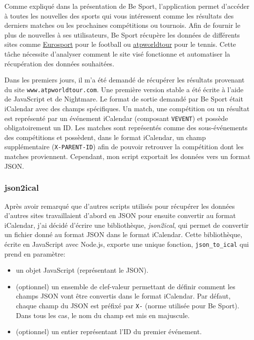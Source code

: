 Comme expliqué dans la présentation de Be Sport, l'application permet d'accéder
à toutes les nouvelles des sports qui vous intéressent comme les résultats des
derniers matches ou les prochaines compétitions ou tournois.
Afin de fournir le plus de nouvelles à ses utilisateurs, Be Sport récupère les
données de différents sites comme \href{https://eurosport.fr}{Eurosport} pour le
football ou \href{https://atpworldtour.com}{atpworldtour} pour le tennis.
Cette tâche nécessite d'analyser comment le site visé fonctionne et automatiser
la récupération des données souhaitées.

Dans les premiers jours, il m'a été demandé de récupérer les résultats provenant
du site \verb|www.atpworldtour.com|.
Une première version stable a été écrite à l'aide de JavaScript et de
Nightmare\cite{nightmare-website}. Le format de sortie demandé par Be Sport était
iCalendar avec des champs spécifiques.
Un match, une compétition ou un résultat est représenté par un événement
iCalendar (composant \verb|VEVENT|) et possède obligatoirement un ID. Les
matches sont représentés comme des sous-événements des compétitions et
possèdent, dans le format iCalendar, un champ supplémentaire
(\verb|X-PARENT-ID|) afin de pouvoir retrouver la compétition dont les matches
proviennent.
Cependant, mon script exportait les données vers un
format JSON. 

\subsubsection*{json2ical}

Après avoir remarqué que d'autres scripts utilisés pour récupérer les données
d'autres sites travaillaient d'abord en JSON pour ensuite convertir au format
iCalendar, j'ai décidé d'écrire une bibliothèque, \emph{json2ical}, qui permet
de convertir un fichier donné au format JSON dans le format iCalendar.
Cette bibliothèque, écrite en JavaScript avec Node.js, exporte une unique
fonction, \verb|json_to_ical| qui prend en paramètre:

\begin{itemize}
  \item un objet JavaScript (représentant le JSON).
  \item (optionnel) un ensemble de clef-valeur permettant de définir comment les champs JSON
    vont être convertis dans le format iCalendar. Par défaut, chaque champ du
    JSON est préfixé par \verb|X-| (norme utilisée pour Be Sport). Dans tous les
    cas, le nom du champ est mis en majuscule.
  \item (optionnel) un entier représentant l'ID du premier événement.
\end{itemize}

